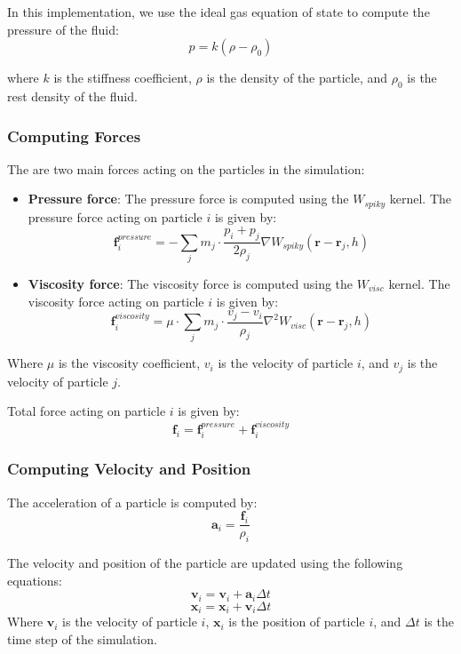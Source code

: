 \documentclass[a4paper]{article}
\begin{document}
In this implementation, we use the ideal gas equation of state to compute the pressure of the fluid:
\[
  p = k(\rho - \rho_0)
\]

where $k$ is the stiffness coefficient, $\rho$ is the density of the particle, and $\rho_0$ is the rest density of the fluid.

\subsubsection{Computing Forces}

The are two main forces acting on the particles in the simulation:
\begin{itemize}
  \item \textbf{Pressure force}:
    The pressure force is computed using the $W_{spiky}$ kernel. The pressure force acting on particle $i$ is given by:
    \begin{equation}
    \nonumber
      \mathbf{f}^{pressure}_i = -\sum_{j} m_j \cdot \frac{p_i + p_j}{2 \rho_j} \nabla W_{spiky}(\mathbf{r} - \mathbf{r}_j, h)
    \end{equation}
  \item \textbf{Viscosity force}:
    The viscosity force is computed using the $W_{visc}$ kernel. The viscosity force acting on particle $i$ is given by:
    \begin{equation}
    \nonumber
      \mathbf{f}^{viscosity}_i = \mu \cdot \sum_{j} m_j \cdot \frac{v_j - v_i}{\rho_j} \nabla^2 W_{visc}(\mathbf{r} - \mathbf{r}_j, h)
    \end{equation}
\end{itemize}

Where $\mu$ is the viscosity coefficient, $v_i$ is the velocity of particle $i$, and $v_j$ is the velocity of particle $j$.

Total force acting on particle $i$ is given by:
\[
  \mathbf{f}_i = \mathbf{f}^{pressure}_i + \mathbf{f}^{viscosity}_i
\]

\subsubsection{Computing Velocity and Position}

The acceleration of a particle is computed by:
\[
  \mathbf{a}_i = \frac{\mathbf{f}_i}{\rho_i}
\]

The velocity and position of the particle are updated using the following equations:
\[
  \mathbf{v}_i = \mathbf{v}_i + \mathbf{a}_i \Delta t
\]
\[
  \mathbf{x}_i = \mathbf{x}_i + \mathbf{v}_i \Delta t
\]
Where $\mathbf{v}_i$ is the velocity of particle $i$, $\mathbf{x}_i$ is the position of particle $i$, and $\Delta t$ is the time step of the simulation.
\end{document}

